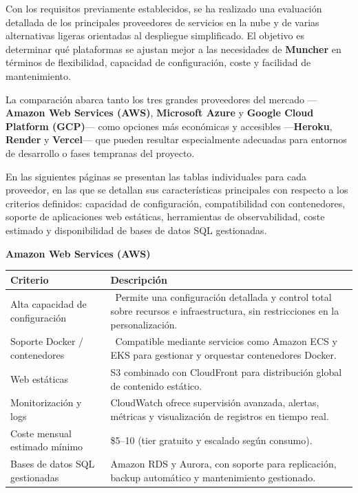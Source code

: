 Con los requisitos previamente establecidos, se ha realizado una evaluación detallada de los principales proveedores de servicios en la nube y de varias alternativas ligeras orientadas al despliegue simplificado. El objetivo es determinar qué plataformas se ajustan mejor a las necesidades de \textbf{Muncher} en términos de flexibilidad, capacidad de configuración, coste y facilidad de mantenimiento.

La comparación abarca tanto los tres grandes proveedores del mercado —\textbf{Amazon Web Services (AWS)}, \textbf{Microsoft Azure} y \textbf{Google Cloud Platform (GCP)}— como opciones más económicas y accesibles —\textbf{Heroku}, \textbf{Render} y \textbf{Vercel}— que pueden resultar especialmente adecuadas para entornos de desarrollo o fases tempranas del proyecto.

En las siguientes páginas se presentan las tablas individuales para cada proveedor, en las que se detallan sus características principales con respecto a los criterios definidos: capacidad de configuración, compatibilidad con contenedores, soporte de aplicaciones web estáticas, herramientas de observabilidad, coste estimado y disponibilidad de bases de datos SQL gestionadas.

\begin{center}
	\renewcommand{\arraystretch}{1.2}
	\setlength{\tabcolsep}{6pt}
	\textbf{Amazon Web Services (AWS)}\\[4pt]
	\begin{tabularx}{\textwidth}{|l|X|}
		\hline
		\textbf{Criterio}               & \textbf{Descripción}                                                                                                                       \\
		\hline
		Alta capacidad de configuración & \checkmark\ Permite una configuración detallada y control total sobre recursos e infraestructura, sin restricciones en la personalización. \\
		\hline
		Soporte Docker / contenedores   & \checkmark\ Compatible mediante servicios como Amazon ECS y EKS para gestionar y orquestar contenedores Docker.                            \\
		\hline
		Web estáticas                   & S3 combinado con CloudFront para distribución global de contenido estático.                                                                \\
		\hline
		Monitorización y logs           & CloudWatch ofrece supervisión avanzada, alertas, métricas y visualización de registros en tiempo real.                                     \\
		\hline
		Coste mensual estimado mínimo   & \$5--10 (tier gratuito y escalado según consumo).                                                                                          \\
		\hline
		Bases de datos SQL gestionadas  & Amazon RDS y Aurora, con soporte para replicación, backup automático y mantenimiento gestionado.                                           \\
		\hline
	\end{tabularx}
\end{center}


